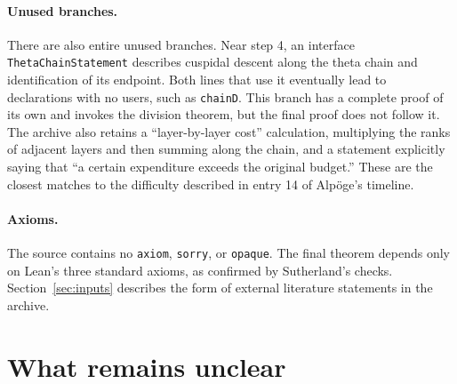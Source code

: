 \documentclass[11pt]{article}
\newcommand{\Lean}[1]{\texttt{\small #1}}
\begin{document}
\paragraph{Unused branches.} There are also entire unused branches. Near step 4, an interface \Lean{ThetaChainStatement} describes cuspidal descent along the theta chain and identification of its endpoint. Both lines that use it eventually lead to declarations with no users, such as \Lean{chainD}. This branch has a complete proof of its own and invokes the division theorem, but the final proof does not follow it. The archive also retains a ``layer-by-layer cost'' calculation, multiplying the ranks of adjacent layers and then summing along the chain, and a statement explicitly saying that ``a certain expenditure exceeds the original budget.'' These are the closest matches to the difficulty described in entry 14 of Alpöge's timeline.

\paragraph{Axioms.} The source contains no \Lean{axiom}, \Lean{sorry}, or \Lean{opaque}. The final theorem depends only on Lean's three standard axioms, as confirmed by Sutherland's checks. Section~\ref{sec:inputs} describes the form of external literature statements in the archive.

\section{What remains unclear}\label{sec:open}
\end{document}
